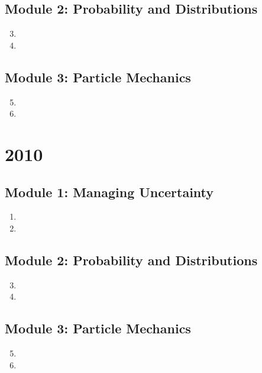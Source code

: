 \documentclass[fleqn,titlepage]{book}
\numberwithin{equation}{section}
\theoremstyle{plain}
\theoremstyle{definition}
\theoremstyle{remark}
\begin{document}
\section{Module 2: Probability and Distributions}
\begin{enumerate}[label=\bfseries  \arabic*.]\setcounter{enumi}{2}
\item 
\item 
\end{enumerate}
\section{Module 3: Particle Mechanics}
\begin{enumerate}[label=\bfseries  \arabic*.]\setcounter{enumi}{4}
\item 
\item 
\end{enumerate}

\chapter{2010}
\section{Module 1: Managing Uncertainty}
\begin{enumerate}[label=\bfseries  \arabic*.]\setcounter{enumi}{0}
\item 
\item 
\end{enumerate}
\section{Module 2: Probability and Distributions}
\begin{enumerate}[label=\bfseries  \arabic*.]\setcounter{enumi}{2}
\item 
\item 
\end{enumerate}
\section{Module 3: Particle Mechanics}
\begin{enumerate}[label=\bfseries  \arabic*.]\setcounter{enumi}{4}
\item 
\item 
\end{enumerate}
\end{document}
